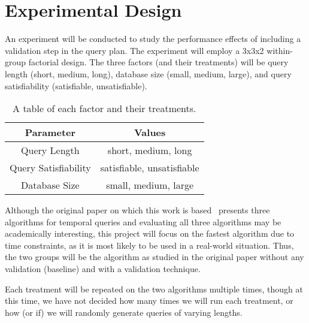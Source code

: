 \documentclass[10pt,letterpaper]{article}
\begin{document}
\section{Experimental Design}
An experiment will be conducted to study the performance effects of including a validation step in the query plan. The experiment will employ a 3x3x2 within-group factorial design. The three factors (and their treatments) will be query length (short, medium, long), database size (small, medium, large), and query satisfiability (satisfiable, unsatisfiable). 

\begin{table}\centering
\begin{tabular}{|c|c|}\hline
\textbf{Parameter} & \textbf{Values}\\\hline
Query Length & {short, medium, long}\\\hline
Query Satisfiability & {satisfiable, unsatisfiable}\\\hline
Database Size & {small, medium, large}\\\hline
\end{tabular}
\caption{A table of each factor and their treatments.}\label{tab:factors}
\end{table}

Although the original paper on which this work is based~\cite{Li:2011} presents three algorithms for temporal queries and evaluating all three algorithms may be academically interesting, this project will focus on the fastest algorithm due to time constraints, as it is most likely to be used in a real-world situation. Thus, the two groups will be the algorithm as studied in the original paper without any validation (baseline) and with a validation technique. 

Each treatment will be repeated on the two algorithms multiple times, though at this time, we have not decided how many times we will run each treatment, or how (or if) we will randomly generate queries of varying lengths.



\end{document}
